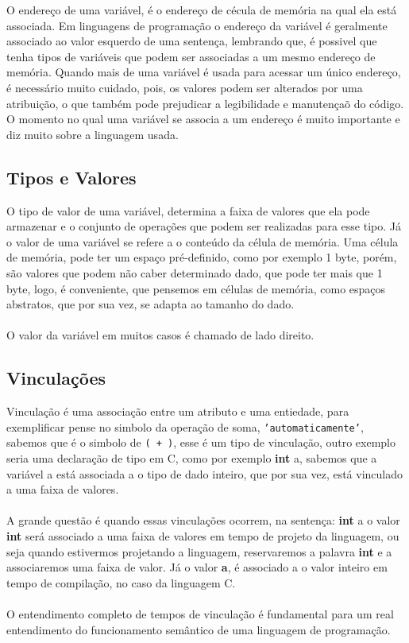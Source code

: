 \documentclass[12pt, onecolumn]{article}
\begin{document}
	O endereço de uma variável, é o endereço de cécula de memória na qual
	ela está associada. Em linguagens de programação o endereço da variável 
	é geralmente associado ao valor esquerdo de uma sentença, lembrando que, 
	é possivel que tenha tipos de variáveis que podem ser associadas a um mesmo 
	endereço de memória. Quando mais de uma variável é usada para acessar um 
	único endereço,	é necessário muito cuidado, pois, os valores podem ser 
	alterados por uma atribuição, o que também pode prejudicar a legibilidade 
	e manutençaõ do código. O momento no qual uma variável se associa a um
	endereço é muito importante e diz muito sobre a linguagem usada.
	
		\subsection{Tipos e Valores}
	
	O tipo de valor de uma variável, determina a faixa de valores que ela pode
	armazenar e o conjunto de operações que podem ser realizadas para esse tipo.
	Já o valor de uma variável se refere a o conteúdo da célula de memória. 
	Uma célula de memória, pode ter um espaço pré-definido, como por exemplo 
	1 byte, porém, são valores que podem não caber determinado dado, que pode 
	ter mais que 1 byte, logo, é conveniente, que pensemos em células de memória, 
	como espaços abstratos, que por sua vez, se adapta ao tamanho do dado.\\
	\\
	O valor da variável em muitos casos é chamado de lado direito.
	

		\subsection{Vinculações}
	
	Vinculação é uma associação entre um atributo e uma entiedade, para exemplificar
	pense no simbolo da operação de soma, \texttt{'automaticamente'}, sabemos que 
	é o simbolo de \texttt{( + )}, esse é um tipo de vinculação, outro exemplo seria
	uma declaração de tipo em C, como por exemplo \textbf{int} a, sabemos que a 
	variável a está associada a o tipo de dado inteiro, que por sua vez, está
	vinculado a uma faixa de valores.\\
	\\
	A grande questão é quando essas vinculações ocorrem, na sentença: \textbf{int} a
	o valor \textbf{int} será associado a uma faixa de valores em tempo de 
	projeto da linguagem, ou seja quando estivermos projetando a linguagem, 
	reservaremos a palavra \textbf{int} e a associaremos uma faixa de valor. 
	Já o valor \textbf{a}, é associado a o valor inteiro em tempo de compilação, 
	no caso da linguagem C.\\
	\\
	O entendimento completo de tempos de vinculação é fundamental para um real
	entendimento do funcionamento semântico de uma linguagem de programação.
	
\end{document}
